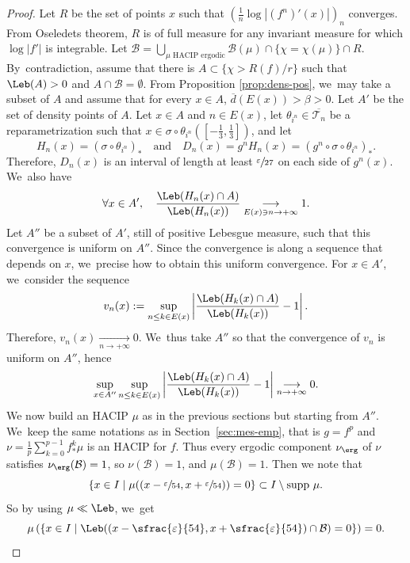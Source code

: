\begin{proof}
Let $R$ be the set of points $x$ such that $\left(\frac{1}{n} \log |(f^n)'(x)| \right)_n$ converges.
From Oseledets theorem, $R$ is of full measure for any invariant measure for which $\log |f'|$ is integrable.
Let $\mathcal{B} = \bigcup_{\mu \text{ HACIP ergodic}} \mathcal{B}(\mu) \cap \{ \chi = \chi(\mu) \} \cap R$. By~contradiction, assume that there is $A \subset \{ \chi > R(f)/r \}$ such that $\Leb(A) > 0$ and $A \cap \mathcal{B} = \emptyset$.
From Proposition \ref{prop:dens-pos}, we~may take a subset of $A$ and assume that for every $x \in A$, $\overline{d}(E(x)) > \beta > 0$.
Let $A'$ be the set of density points of $A$.
Let $x \in A$ and $n \in E(x)$, let $\theta_{i^n} \in \overline{\mathcal{T}_n}$ be a reparametrization such that $x \in \sigma \circ \theta_{i^n} \left (\left [ - \frac{1}{3}, \frac{1}{3} \right ] \right)$, and let
\[
H_n(x) = \left (\sigma \circ \theta_{i^n} \right)_* \quad \text{and} \quad D_n(x) = g^n H_n(x) = \left (g^n \circ \sigma \circ \theta_{i^n} \right)_*.
\]
Therefore, $D_n(x)$ is an interval of length at least $\sfrac{\varepsilon}{27}$ on each side of $g^n(x)$. We~also have
\[
\forall x \in A',\quad \frac{\Leb(H_n(x) \cap A)}{\Leb(H_n(x))} \underset{E(x) \ni n \to +\infty}{\longrightarrow} 1.
\]
Let $A''$ be a subset of $A'$, still of positive Lebesgue measure, such that this convergence is uniform on $A''$.
Since the convergence is along a sequence that depends on $x$, we~precise how to obtain this uniform convergence.
For $x \in A'$, we~consider the sequence
\[
v_n(x) := \sup_{n \leq k \in E(x)} \left | \frac{\Leb(H_k(x) \cap A)}{\Leb(H_k(x))} - 1 \right |.
\]
Therefore, $v_n(x) \underset{n \to +\infty}{\longrightarrow} 0$. We~thus take $A''$ so that the convergence of $v_n$ is uniform on $A''$, hence
\[
\sup_{x \in A''} \sup_{n \leq k \in E(x)} \left | \frac{\Leb(H_k(x) \cap A)}{\Leb(H_k(x))} - 1 \right | \underset{n \to +\infty}{\longrightarrow} 0.
\]
We now build an HACIP $\mu$ as in the previous sections but starting from $A''$. We~keep the same notations as in Section~\ref{sec:mes-emp}, that is $g=f^p$ and $\nu = \frac{1}{p} \sum_{k=0}^{p-1} f^k_* \mu$ is an HACIP for $f$.
Thus every ergodic component $\nu_{\erg}$ of $\nu$ satisfies $\nu_{\erg}(\mathcal{B}) = 1$, so $\nu(\mathcal{B})=1$, and $\mu(\mathcal{B}) = 1$.
Then we note that
\[
\{ x \in I \mid \mu((x - \sfrac{\varepsilon}{54}, x + \sfrac{\varepsilon}{54})) = 0 \} \subset I \setminus \text{supp } \mu.
\]
So by using $\mu \ll \Leb$, we~get
\[
\mu \left (\{ x \in I \mid \Leb((x - \sfrac{\varepsilon}{54}, x + \sfrac{\varepsilon}{54}) \cap \mathcal{B}) = 0 \} \right) = 0.
\]
\end{proof}
